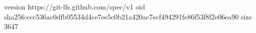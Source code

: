 version https://git-lfs.github.com/spec/v1
oid sha256:ecc536ac0dfb05534d4ce7ee5c0b21a420ac7ecf494291fe86f53f8f2e06ea90
size 3647
